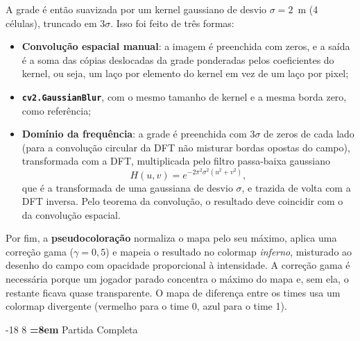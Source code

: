 \documentclass[12pt]{article}
\makeatletter
\renewcommand\subsection{\@startsection{subsection}{2}{\z@}%
                       {-18\p@ \@plus -4\p@ \@minus -4\p@}%
                       {8\p@ \@plus 4\p@ \@minus 4\p@}%
                       {\normalfont\normalsize\bfseries\boldmath
                        \rightskip=\z@ \@plus 8em\pretolerance=10000 }}
\makeatother
\begin{document}
A grade é então suavizada por um kernel gaussiano de desvio $\sigma = 2$~m
(4 células), truncado em $3\sigma$. Isso foi feito de três formas:

\begin{itemize}
  \item \textbf{Convolução espacial manual}: a imagem é preenchida com zeros, e a saída
        é a soma das cópias deslocadas da grade ponderadas pelos coeficientes do
        kernel, ou seja, um laço por elemento do kernel em vez de um laço por pixel;
  \item \textbf{\texttt{cv2.GaussianBlur}}, com o mesmo tamanho de kernel e a mesma borda
        zero, como referência;
  \item \textbf{Domínio da frequência}: a grade é preenchida com $3\sigma$ de zeros de
        cada lado (para a convolução circular da DFT não misturar bordas opostas do
        campo), transformada com a DFT, multiplicada pelo filtro passa-baixa gaussiano
        \begin{equation}
        H(u, v) = e^{-2\pi^2\sigma^2 (u^2 + v^2)},
        \end{equation}
        que é a transformada de uma gaussiana de desvio $\sigma$, e trazida de volta com
        a DFT inversa. Pelo teorema da convolução, o resultado deve coincidir com o da
        convolução espacial.
\end{itemize}

Por fim, a \textbf{pseudocoloração} normaliza o mapa pelo seu máximo, aplica uma
correção gama ($\gamma = 0{,}5$) e mapeia o resultado no colormap \textit{inferno},
misturado ao desenho do campo com opacidade proporcional à intensidade. A correção
gama é necessária porque um jogador parado concentra o máximo do mapa e, sem ela, o
restante ficava quase transparente. O mapa de diferença entre os times usa um
colormap divergente (vermelho para o time 0, azul para o time 1).

\subsection{Partida Completa}
\label{sec:partida}
\end{document}
